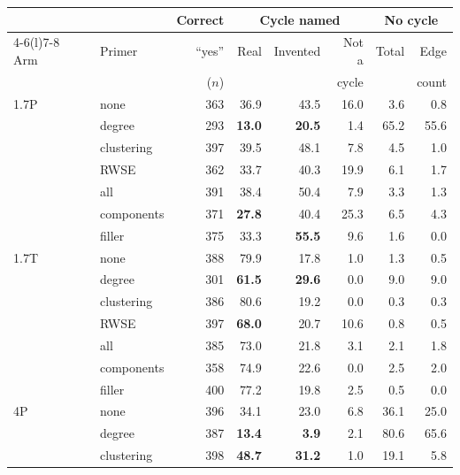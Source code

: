 \begin{table}[!t]
\centering\scriptsize
\setlength{\tabcolsep}{3.4pt}
\begin{tabular}{@{}llrrrrrr@{}}
\toprule
 & & Correct & \multicolumn{3}{c}{Cycle named} & \multicolumn{2}{c}{No cycle}\\
\cmidrule(lr){4-6}\cmidrule(l){7-8}
Arm & Primer & ``yes'' & Real & Invented & Not a & Total & Edge\\
 & & ($n$) & & & cycle & & count\\
\midrule
1.7P & none & 363 & 36.9 & 43.5 & 16.0 & 3.6 & 0.8\\ %
 & degree & 293 & \textbf{13.0} & \textbf{20.5} & 1.4 & 65.2 & 55.6\\ %
 & clustering & 397 & 39.5 & 48.1 & 7.8 & 4.5 & 1.0\\ %
 & RWSE & 362 & 33.7 & 40.3 & 19.9 & 6.1 & 1.7\\ %
 & all & 391 & 38.4 & 50.4 & 7.9 & 3.3 & 1.3\\ %
 & components & 371 & \textbf{27.8} & 40.4 & 25.3 & 6.5 & 4.3\\ %
 & filler & 375 & 33.3 & \textbf{55.5} & 9.6 & 1.6 & 0.0\\ %
\addlinespace[2pt]
1.7T & none & 388 & 79.9 & 17.8 & 1.0 & 1.3 & 0.5\\ %
 & degree & 301 & \textbf{61.5} & \textbf{29.6} & 0.0 & 9.0 & 9.0\\ %
 & clustering & 386 & 80.6 & 19.2 & 0.0 & 0.3 & 0.3\\ %
 & RWSE & 397 & \textbf{68.0} & 20.7 & 10.6 & 0.8 & 0.5\\ %
 & all & 385 & 73.0 & 21.8 & 3.1 & 2.1 & 1.8\\ %
 & components & 358 & 74.9 & 22.6 & 0.0 & 2.5 & 2.0\\ %
 & filler & 400 & 77.2 & 19.8 & 2.5 & 0.5 & 0.0\\ %
\addlinespace[2pt]
4P & none & 396 & 34.1 & 23.0 & 6.8 & 36.1 & 25.0\\ %
 & degree & 387 & \textbf{13.4} & \textbf{3.9} & 2.1 & 80.6 & 65.6\\ %
 & clustering & 398 & \textbf{48.7} & \textbf{31.2} & 1.0 & 19.1 & 5.8\\ %

\end{tabular}
\end{table}
